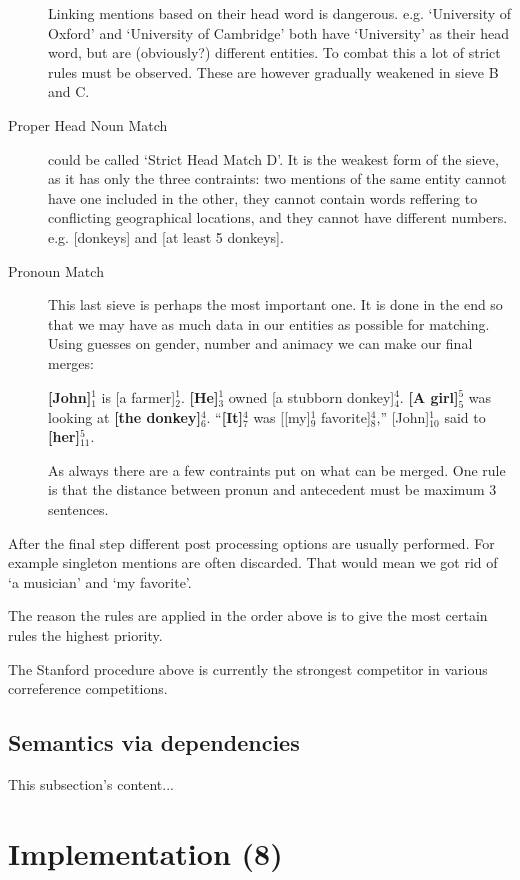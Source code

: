 \documentclass[12pt]{article}
\let\stdsection\section
\renewcommand\section{\newpage\stdsection}
\begin{document}
\begin{description}
Linking mentions based on their head word is dangerous. e.g. `University of Oxford' and `University of Cambridge' both have `University' as their head word, but are (obviously?) different entities. To combat this a lot of strict rules must be observed. These are however gradually weakened in sieve B and C.
\item[Proper Head Noun Match] could be called `Strict Head Match D'. It is the weakest form of the sieve, as it has only the three contraints: two mentions of the same entity cannot have one included in the other, they cannot contain words reffering to conflicting geographical locations, and they cannot have different numbers. e.g. [donkeys] and [at least 5 donkeys].
\item[Pronoun Match]
This last sieve is perhaps the most important one. It is done in the end so that we may have as much data in our entities as possible for matching. Using guesses on gender, number and animacy we can make our final merges:

\textbf{[John]$_1^1$} is [a farmer]$_2^1$. \textbf{[He]$_3^1$} owned [a stubborn donkey]$_4^4$.\newline
\textbf{[A girl]$_5^5$} was looking at \textbf{[the donkey]$_6^4$}.\newline
``\textbf{[It]$_7^4$} was [[my]$_9^1$ favorite]$_8^4$,'' [John]$_{10}^1$ said to \textbf{[her]$_{11}^{5}$}.

As always there are a few contraints put on what can be merged. One rule is that the distance between pronun and antecedent must be maximum 3 sentences.
\end{description}

After the final step different post processing options are usually performed. For example singleton mentions are often discarded. That would mean we got rid of `a musician' and `my favorite'.

The reason the rules are applied in the order above is to give the most certain rules the highest priority.

The Stanford procedure above is currently the strongest competitor in various correference competitions.

\subsection{Semantics via dependencies}
This subsection's content...

\section{Implementation (8)}
\end{document}
